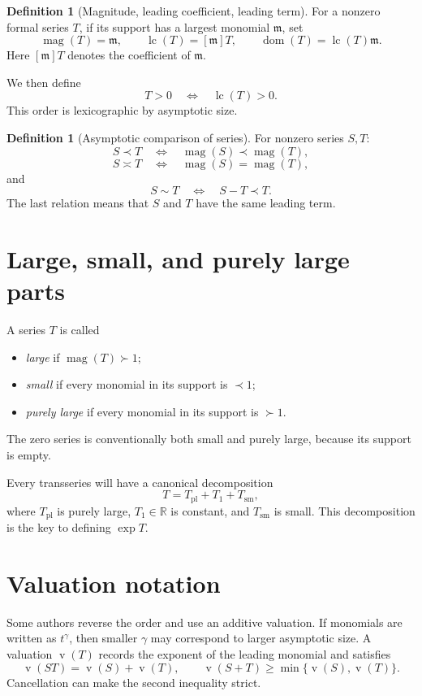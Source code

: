 \documentclass[11pt,oneside]{book}
\theoremstyle{definition}
\newtheorem{definition}[theorem]{Definition}
\theoremstyle{remark}
\newcommand{\R}{\mathbb{R}}
\newcommand{\m}{\mathfrak{m}}
\newcommand{\magop}{\operatorname{mag}}
\newcommand{\lc}{\operatorname{lc}}
\newcommand{\domop}{\operatorname{dom}}
\newcommand{\val}{\operatorname{v}}
\newcommand{\precdom}{\prec}
\newcommand{\succdom}{\succ}
\begin{document}
\begin{definition}[Magnitude, leading coefficient, leading term]
For a nonzero formal series $T$, if its support has a largest monomial $\m$, set
\[
  \magop(T)=\m,\qquad
  \lc(T)=[\m]T,\qquad
  \domop(T)=\lc(T)\m.
\]
Here $[\m]T$ denotes the coefficient of $\m$.
\end{definition}

We then define
\[
  T>0 \quad\Longleftrightarrow\quad \lc(T)>0.
\]
This order is lexicographic by asymptotic size.

\begin{definition}[Asymptotic comparison of series]
For nonzero series $S,T$:
\[
  S\precdom T \quad\Longleftrightarrow\quad
  \magop(S)\precdom\magop(T),
\]
\[
  S\asymp T \quad\Longleftrightarrow\quad
  \magop(S)=\magop(T),
\]
and
\[
  S\sim T \quad\Longleftrightarrow\quad
  S-T\precdom T.
\]
The last relation means that $S$ and $T$ have the same leading term.
\end{definition}

\section{Large, small, and purely large parts}

A series $T$ is called
\begin{itemize}
\item \emph{large} if $\magop(T)\succdom1$;
\item \emph{small} if every monomial in its support is $\precdom1$;
\item \emph{purely large} if every monomial in its support is $\succdom1$.
\end{itemize}
The zero series is conventionally both small and purely large, because its
support is empty.

Every transseries will have a canonical decomposition
\begin{equation}
  T=T_{\mathrm{pl}}+T_1+T_{\mathrm{sm}},
  \label{eq:canonical-decomposition-preview}
\end{equation}
where $T_{\mathrm{pl}}$ is purely large, $T_1\in\R$ is constant, and
$T_{\mathrm{sm}}$ is small. This decomposition is the key to defining
$\exp T$.

\section{Valuation notation}

Some authors reverse the order and use an additive valuation. If monomials are
written as $t^\gamma$, then smaller $\gamma$ may correspond to larger
asymptotic size. A valuation $\val(T)$ records the exponent of the leading
monomial and satisfies
\[
  \val(ST)=\val(S)+\val(T),\qquad
  \val(S+T)\ge\min\{\val(S),\val(T)\}.
\]
Cancellation can make the second inequality strict.
\end{document}
